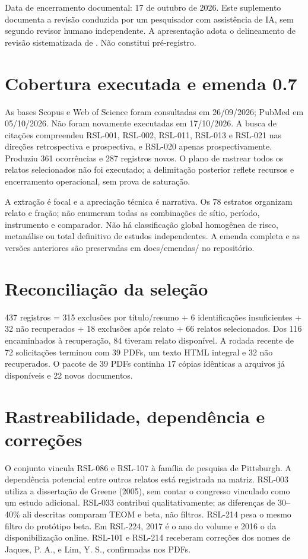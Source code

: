 
Data de encerramento documental: 17 de outubro de 2026. Este suplemento documenta a revisão conduzida por um pesquisador com assistência de IA, sem segundo revisor humano independente. A apresentação adota o delineamento de revisão sistematizada de \textcite{grant2009}. Não constitui pré-registro.

\section*{Cobertura executada e emenda 0.7}
As bases Scopus e Web of Science foram consultadas em 26/09/2026; PubMed em 05/10/2026. Não foram novamente executadas em 17/10/2026. A busca de citações compreendeu RSL-001, RSL-002, RSL-011, RSL-013 e RSL-021 nas direções retrospectiva e prospectiva, e RSL-020 apenas prospectivamente. Produziu 361 ocorrências e 287 registros novos. O plano de rastrear todos os relatos selecionados não foi executado; a delimitação posterior reflete recursos e encerramento operacional, sem prova de saturação.

A extração é focal e a apreciação técnica é narrativa. Os 78 estratos organizam relato e fração; não enumeram todas as combinações de sítio, período, instrumento e comparador. Não há classificação global homogênea de risco, metanálise ou total definitivo de estudos independentes. A emenda completa e as versões anteriores são preservadas em docs/emendas/ no repositório.

\section*{Reconciliação da seleção}
437 registros = 315 exclusões por título/resumo + 6 identificações insuficientes + 32 não recuperados + 18 exclusões após relato + 66 relatos selecionados. Dos 116 encaminhados à recuperação, 84 tiveram relato disponível. A rodada recente de 72 solicitações terminou com 39 PDFs, um texto HTML integral e 32 não recuperados. O pacote de 39 PDFs continha 17 cópias idênticas a arquivos já disponíveis e 22 novos documentos.

\section*{Rastreabilidade, dependência e correções}
O conjunto vincula RSL-086 e RSL-107 à família de pesquisa de Pittsburgh. A dependência potencial entre outros relatos está registrada na matriz. RSL-003 utiliza a dissertação de Greene (2005), sem contar o congresso vinculado como um estudo adicional. RSL-033 contribui qualitativamente; as diferenças de 30--40\% ali descritas comparam TEOM e beta, não filtros. RSL-214 pesa o mesmo filtro do protótipo beta. Em RSL-224, 2017 é o ano do volume e 2016 o da disponibilização online. RSL-101 e RSL-214 receberam correções dos nomes de Jaques, P. A., e Lim, Y. S., confirmadas nos PDFs.

